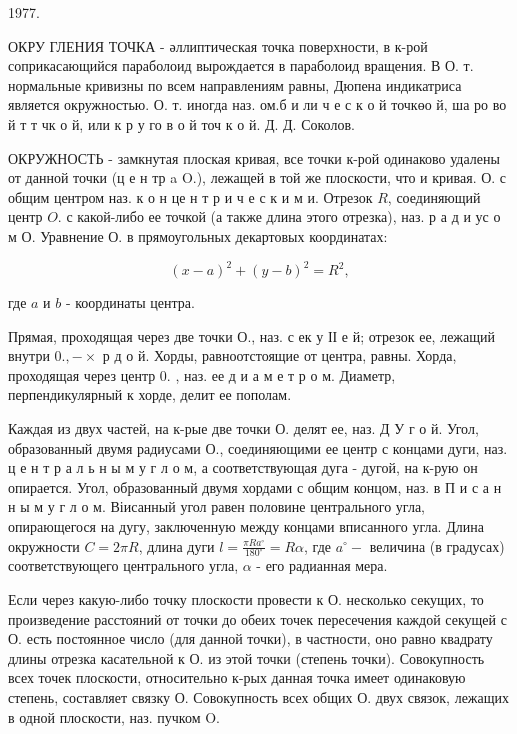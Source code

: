 \documentclass[10pt]{article}
\begin{document}
1977.



ОКРУ ГЛЕНИЯ ТОЧКА - әллиптическая точка поверхности, в к-рой соприкасающийся параболоид вырождается в параболоид вращения. В О. т. нормальные кривизны по всем направлениям равны, Дюпена индикатриса является окружностью. О. т. иногда наз. ом.б и ли ч е с к о й точкөо й, ша ро во й т т чк о й, или к р у го в о й точ к о й. Д. Д. Соколов.



ОКРУЖНОСТЬ - замкнутая плоская кривая, все точки к-рой одинаково удалены от данной точки (ц е н тр a O.), лежащей в той же плоскости, что и кривая. О. с общим центром наз. к о н це н т р и ч е с к и м и. Отрезок $R$, соединяющий центр $O$. с какой-либо ее точкой (а также длина этого отрезка), наз. р а д и ус о м О. Уравнение О. в прямоугольных декартовых координатах:



\[

(x-a)^{2}+(y-b)^{2}=R^{2},

\]



где $a$ и $b$ - координаты центра.



Прямая, проходящая через две точки О., наз. с ек у ІІ е й; отрезок ее, лежащий внутри $0 .,-\times$ р д о й. Хорды, равноотстоящие от центра, равны. Хорда, проходящая через центр 0. , наз. ее д и а м е т р о м. Диаметр, перпендикулярный к хорде, делит ее пополам.



Каждая из двух частей, на к-рые две точки О. делят ее, наз. Д У г о й. Угол, образованный двумя радиусами О., соединяющими ее центр с концами дуги, наз. ц е н т р а л ь н ы м у г л о м, а соответствующая дуга - дугой, на к-рую он опирается. Угол, образованный двумя хордами с общим концом, наз. в П и с а н н ы м у г л о м. Віисанный угол равен половине центрального угла, опирающегося на дугу, заключенную между концами вписанного угла. Длина окружности $C=2 \pi R$, длина дуги $l=\frac{\pi R a^{\circ}}{180^{\circ}}=R \alpha$, где $a^{\circ}-$ величина (в градусах) соответствующего центрального угла, $\alpha$ - его радианная мера.



Если через какую-либо точку плоскости провести к О. несколько секущих, то произведение расстояний от точки до обеих точек пересечения каждой секущей с О. есть постоянное число (для данной точки), в частности, оно равно квадрату длины отрезка касательной к О. из этой точки (степень точки). Совокупность всех точек плоскости, относительно к-рых данная точка имеет одинаковую степень, составляет связку О. Совокупность всех общих О. двух связок, лежащих в одной плоскости, наз. пучком $\mathrm{O}$.
\end{document}
